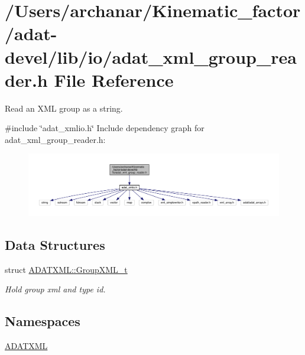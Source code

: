 \hypertarget{adat-devel_2lib_2io_2adat__xml__group__reader_8h}{}\section{/\+Users/archanar/\+Kinematic\+\_\+factor/adat-\/devel/lib/io/adat\+\_\+xml\+\_\+group\+\_\+reader.h File Reference}
\label{adat-devel_2lib_2io_2adat__xml__group__reader_8h}


Read an X\+ML group as a string.  


{\ttfamily \#include \char`\"{}adat\+\_\+xmlio.\+h\char`\"{}}\newline
Include dependency graph for adat\+\_\+xml\+\_\+group\+\_\+reader.\+h\+:
\nopagebreak
\begin{figure}[H]
\begin{center}
\leavevmode
\includegraphics[width=350pt]{de/df8/adat-devel_2lib_2io_2adat__xml__group__reader_8h__incl}
\end{center}
\end{figure}
\subsection*{Data Structures}
\begin{DoxyCompactItemize}
\item 
struct \mbox{\hyperlink{structADATXML_1_1GroupXML__t}{A\+D\+A\+T\+X\+M\+L\+::\+Group\+X\+M\+L\+\_\+t}}
\begin{DoxyCompactList}\small\item\em Hold group xml and type id. \end{DoxyCompactList}\end{DoxyCompactItemize}
\subsection*{Namespaces}
\begin{DoxyCompactItemize}
\item 
 \mbox{\hyperlink{namespaceADATXML}{A\+D\+A\+T\+X\+ML}}
\end{DoxyCompactItemize}
